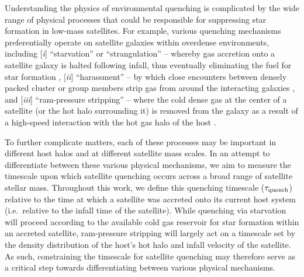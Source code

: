 Understanding the physics of environmental quenching is complicated by
the wide range of physical processes that could be responsible for
suppressing star formation in low-mass satellites. For example,
various quenching mechanisms preferentially operate on satellite
galaxies within overdense environments, including [\emph{i}]
``starvation'' or ``strangulation'' -- whereby gas accretion onto a
satellite galaxy is halted following infall, thus eventually
eliminating the fuel for star formation \citep{larson80, kawata08},
[\emph{ii}] ``harassment'' -- by which close encounters between
densely packed cluster or group members strip gas from around the
interacting galaxies \citep{moore96}, and [\emph{iii}] ``ram-pressure
stripping'' -- where the cold dense gas at the center of a satellite
(or the hot halo surrounding it) is %
removed from the galaxy as a result of a high-speed interaction with
the hot gas halo of the host \citep{gunn72, bekki09}.
%

To further complicate matters, each of these processes may be
important in different host halos and at different satellite mass
scales.
%
In an attempt to differentiate between these various physical
mechanisms, we aim to measure the timescale upon which satellite
quenching occurs across a broad range of satellite stellar
mass. Throughout this work, we define this quenching timescale
($\tau_{\rm quench}$) relative to the time at which a satellite was
accreted onto its current host system (i.e.~relative to the infall
time of the satellite). While quenching via starvation will proceed
according to the available cold gas reservoir for star formation
within an accreted satellite, ram-pressure stripping will largely act
on a timescale set by the density distribution of the host's hot halo
and infall velocity of the satellite. As such, constraining the
timescale for satellite quenching may therefore serve as a critical
step towards differentiating between various physical mechanisms.



